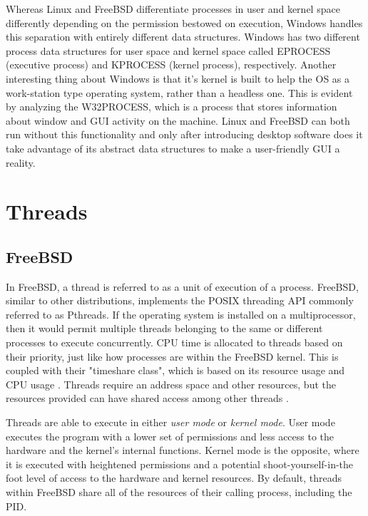 \documentclass[10pt,draftclsnofoot,onecolumn]{IEEEtran}
\begin{document}
\par Whereas Linux and FreeBSD differentiate processes in user and kernel space differently depending on the permission bestowed on execution, Windows handles this separation with entirely different data structures.
Windows has two different process data structures for user space and kernel space called EPROCESS (executive process) and KPROCESS (kernel process), respectively.
Another interesting thing about Windows is that it's kernel is built to help the OS as a work-station type operating system, rather than a headless one.
This is evident by analyzing the W32PROCESS, which is a process that stores information about window and GUI activity on the machine.
Linux and FreeBSD can both run without this functionality and only after introducing desktop software does it take advantage of its abstract data structures to make a user-friendly GUI a reality.

\section{Threads}
\label{sec:Threads}

\subsection{FreeBSD}
\label{sub:Thread FreeBSD}

\par In FreeBSD, a thread is referred to as a unit of execution of a process.
FreeBSD, similar to other distributions, implements the POSIX threading API commonly referred to as Pthreads.
If the operating system is installed on a multiprocessor, then it would permit multiple threads belonging to the same or different processes to execute concurrently.
CPU time is allocated to threads based on their priority, just like how processes are within the FreeBSD kernel.
This is coupled with their "timeshare class", which is based on its resource usage and CPU usage \cite{bsd:1}.
Threads require an address space and other resources, but the resources provided can have shared access among other threads \cite{bsd:1}.

\par Threads are able to execute in either \textit{user mode} or \textit{kernel mode}.
User mode executes the program with a lower set of permissions and less access to the hardware and the kernel's internal functions.
Kernel mode is the opposite, where it is executed with heightened permissions and a potential shoot-yourself-in-the foot level of access to the hardware and kernel resources.
By default, threads within FreeBSD share all of the resources of their calling process, including the PID.
\end{document}
